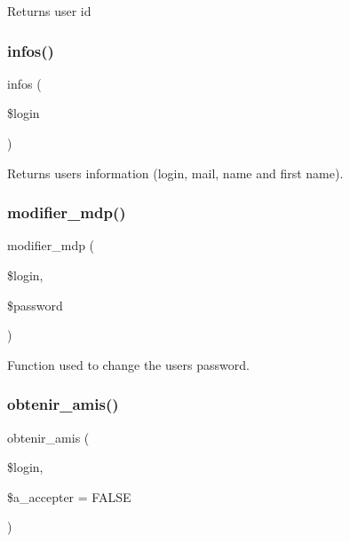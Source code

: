 Returns user id \mbox{\label{class_user__model_a40e51a5c6fc819d5c0f2e678a124d60e}} 
\subsubsection{\texorpdfstring{infos()}{infos()}}
{\footnotesize\ttfamily infos (\begin{DoxyParamCaption}\item[{}]{\$login }\end{DoxyParamCaption})}

Returns user\textquotesingle{}s information (login, mail, name and first name). \mbox{\label{class_user__model_a1e8eb7d545bc221a640bffdebf063e3e}} 
\subsubsection{\texorpdfstring{modifier\+\_\+mdp()}{modifier\_mdp()}}
{\footnotesize\ttfamily modifier\+\_\+mdp (\begin{DoxyParamCaption}\item[{}]{\$login,  }\item[{}]{\$password }\end{DoxyParamCaption})}

Function used to change the user\textquotesingle{}s password. \mbox{\label{class_user__model_a778aaa6e58fc26c945fffba005867051}} 
\subsubsection{\texorpdfstring{obtenir\+\_\+amis()}{obtenir\_amis()}}
{\footnotesize\ttfamily obtenir\+\_\+amis (\begin{DoxyParamCaption}\item[{}]{\$login,  }\item[{}]{\$a\+\_\+accepter = {\ttfamily FALSE} }\end{DoxyParamCaption})}

